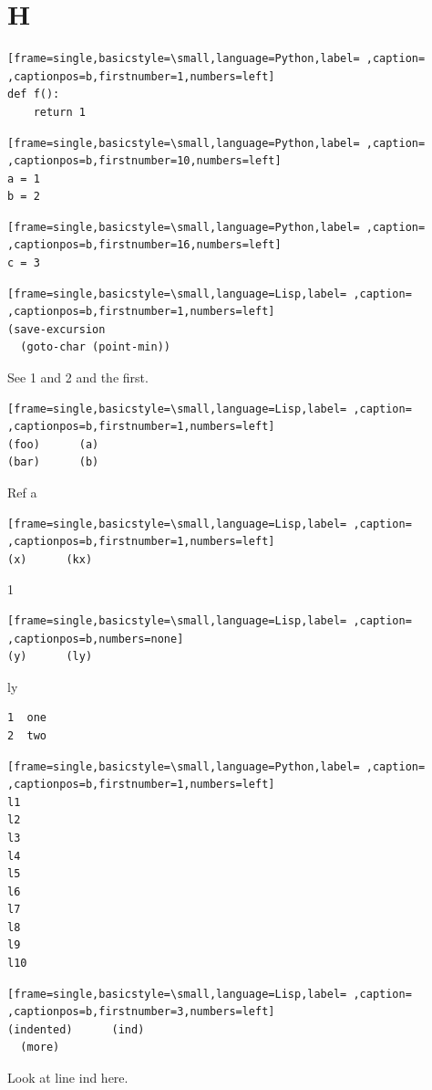 \documentclass[11pt]{article}
\author{root}
\date{\today}
\title{}
\begin{document}
\tableofcontents

\section{H}
\label{sec:org5773a79}
\begin{lstlisting}[frame=single,basicstyle=\small,language=Python,label= ,caption= ,captionpos=b,firstnumber=1,numbers=left]
def f():
    return 1
\end{lstlisting}

\begin{lstlisting}[frame=single,basicstyle=\small,language=Python,label= ,caption= ,captionpos=b,firstnumber=10,numbers=left]
a = 1
b = 2
\end{lstlisting}

\begin{lstlisting}[frame=single,basicstyle=\small,language=Python,label= ,caption= ,captionpos=b,firstnumber=16,numbers=left]
c = 3
\end{lstlisting}

\begin{lstlisting}[frame=single,basicstyle=\small,language=Lisp,label= ,caption= ,captionpos=b,firstnumber=1,numbers=left]
(save-excursion
  (goto-char (point-min))
\end{lstlisting}
See 1 and 2 and the first.

\begin{lstlisting}[frame=single,basicstyle=\small,language=Lisp,label= ,caption= ,captionpos=b,firstnumber=1,numbers=left]
(foo)      (a)
(bar)      (b)
\end{lstlisting}
Ref a

\begin{lstlisting}[frame=single,basicstyle=\small,language=Lisp,label= ,caption= ,captionpos=b,firstnumber=1,numbers=left]
(x)      (kx)
\end{lstlisting}
1

\begin{lstlisting}[frame=single,basicstyle=\small,language=Lisp,label= ,caption= ,captionpos=b,numbers=none]
(y)      (ly)
\end{lstlisting}
ly

\begin{verbatim}
1  one
2  two
\end{verbatim}

\begin{lstlisting}[frame=single,basicstyle=\small,language=Python,label= ,caption= ,captionpos=b,firstnumber=1,numbers=left]
l1
l2
l3
l4
l5
l6
l7
l8
l9
l10
\end{lstlisting}

\begin{lstlisting}[frame=single,basicstyle=\small,language=Lisp,label= ,caption= ,captionpos=b,firstnumber=3,numbers=left]
(indented)      (ind)
  (more)
\end{lstlisting}
Look at line ind here.
\end{document}
